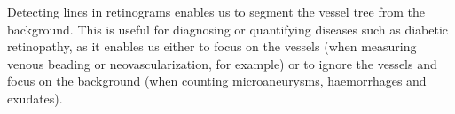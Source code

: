 Detecting lines in retinograms enables us to segment the vessel tree from the background. This is useful for diagnosing or quantifying diseases such as diabetic retinopathy, as it enables us either to focus on the vessels (when measuring venous beading or neovascularization, for example) or to ignore the vessels and focus on the background (when counting microaneurysms, haemorrhages and exudates).
